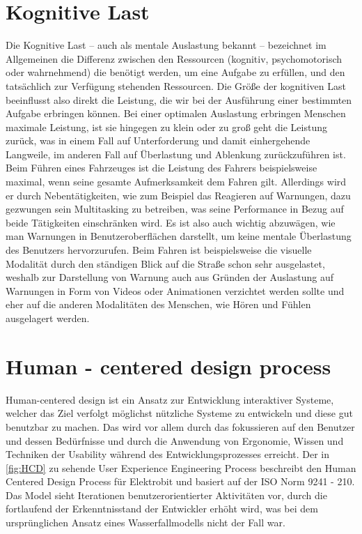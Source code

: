 \section{Kognitive Last}
Die Kognitive Last – auch als mentale Auslastung bekannt – bezeichnet im Allgemeinen die Differenz zwischen den Ressourcen (kognitiv, psychomotorisch oder wahrnehmend) die benötigt werden, um eine Aufgabe zu erfüllen, und den tatsächlich zur Verfügung stehenden Ressourcen. Die Größe der kognitiven Last beeinflusst also direkt die Leistung, die wir bei der Ausführung einer bestimmten Aufgabe erbringen können. Bei einer optimalen Auslastung erbringen Menschen maximale Leistung, ist sie hingegen zu klein oder zu groß geht die Leistung zurück, was in einem Fall auf Unterforderung und damit einhergehende Langweile, im anderen Fall auf Überlastung und Ablenkung zurückzuführen ist\cite{.e}. Beim Führen eines Fahrzeuges ist die Leistung des Fahrers beispielsweise maximal, wenn seine gesamte Aufmerksamkeit dem Fahren gilt. Allerdings wird er durch Nebentätigkeiten, wie zum Beispiel das Reagieren auf Warnungen, dazu gezwungen sein Multitasking zu betreiben, was seine Performance in Bezug auf beide Tätigkeiten einschränken wird. Es ist also auch wichtig abzuwägen, wie man Warnungen in Benutzeroberflächen darstellt, um keine mentale Überlastung des Benutzers hervorzurufen. Beim Fahren ist beispielsweise die visuelle Modalität durch den ständigen Blick auf die Straße schon sehr ausgelastet, weshalb zur Darstellung von Warnung auch aus Gründen der Auslastung auf Warnungen in Form von Videos oder Animationen verzichtet werden sollte und eher auf die anderen Modalitäten des Menschen, wie Hören und Fühlen ausgelagert werden.

\section{Human - centered  design process}
Human-centered design ist ein Ansatz zur Entwicklung interaktiver Systeme, welcher das Ziel verfolgt möglichst nützliche Systeme zu entwickeln und diese gut benutzbar zu machen.
Das wird vor allem durch das fokussieren auf den Benutzer und dessen Bedürfnisse und durch die Anwendung von Ergonomie, Wissen und Techniken der Usability während des Entwicklungsprozesses erreicht\cite{.}.
Der in \cref{fig:HCD} zu sehende User Experience Engineering Process beschreibt den Human Centered Design Process für Elektrobit und basiert auf der ISO Norm 9241 - 210.
Das Model sieht Iterationen benutzerorientierter Aktivitäten vor, durch die fortlaufend der Erkenntnisstand der Entwickler erhöht wird, was bei dem ursprünglichen Ansatz eines Wasserfallmodells nicht der Fall war.

